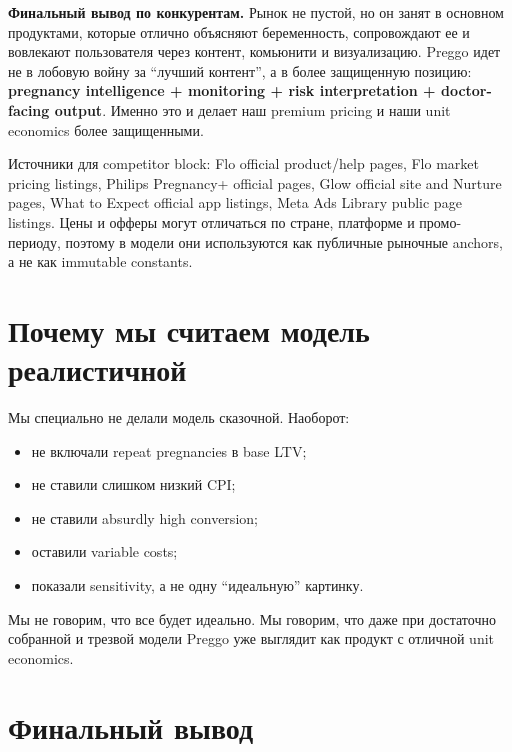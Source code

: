 \documentclass[10pt,a4paper]{article}
\begin{document}
\begin{tcolorbox}[
    enhanced,
    breakable,
    colback=brandblush,
    colframe=brandcoraldeep,
    boxrule=0.85pt,
    arc=4pt,
    left=10pt,right=10pt,top=8pt,bottom=8pt
]
\textbf{Финальный вывод по конкурентам.}
Рынок не пустой, но он занят в основном продуктами, которые отлично объясняют беременность, сопровождают ее и вовлекают пользователя через контент, комьюнити и визуализацию. Preggo идет не в лобовую войну за ``лучший контент'', а в более защищенную позицию: \textbf{pregnancy intelligence + monitoring + risk interpretation + doctor-facing output}. Именно это и делает наш premium pricing и наши unit economics более защищенными.
\end{tcolorbox}

\vspace{4pt}
{\footnotesize \textcolor{mutedtext}{Источники для competitor block: Flo official product/help pages, Flo market pricing listings, Philips Pregnancy+ official pages, Glow official site and Nurture pages, What to Expect official app listings, Meta Ads Library public page listings. Цены и офферы могут отличаться по стране, платформе и промо-периоду, поэтому в модели они используются как публичные рыночные anchors, а не как immutable constants.}}

\section{Почему мы считаем модель реалистичной}

Мы специально не делали модель сказочной. Наоборот:

\begin{itemize}
    \item не включали repeat pregnancies в base LTV;
    \item не ставили слишком низкий CPI;
    \item не ставили absurdly high conversion;
    \item оставили variable costs;
    \item показали sensitivity, а не одну ``идеальную'' картинку.
\end{itemize}

Мы не говорим, что все будет идеально. Мы говорим, что даже при достаточно собранной и трезвой модели Preggo уже выглядит как продукт с отличной unit economics.

\section{Финальный вывод}
\end{document}
